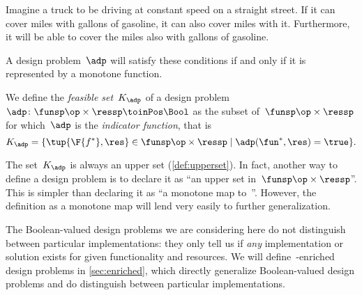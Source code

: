 \begin{example}
    Imagine a truck to be driving at constant speed on a straight street.
    If it can cover \unit[100]{miles} with \unit[5]{gallons} of gasoline, it can also cover \unit[80]{miles} with it.
    Furthermore, it will be able to cover the \unit[100]{miles} also with \unit[10]{gallons} of gasoline.
\end{example}

A design problem~$\adp$ will satisfy these conditions if and only if it is represented by a monotone function.
\begin{definition} \label{def:dp-feasible-set}
    We define the \emph{feasible set}~$K_\adp$ of a design problem~$\adp\colon \funsp\op \times \ressp\toinPos \Bool$ as the subset of~$\funsp \op\times \ressp$ for which~$\adp$ is the \emph{indicator function}, that is
    \begin{equation*}
        K_\adp = \{ \tup{\F{f^*},\res} \in \funsp \op\times \ressp  \mid
        \adp(\fun^*, \res) = \true
        \}.
    \end{equation*}
\end{definition}
\begin{remark}
    The set~$K_\adp$ is always an upper set (\cref{def:upperset}).
    In fact, another way to define a design problem is to declare it as ``an upper set in~$\funsp\op \times \ressp$''. This is simpler than declaring it as ``a monotone map to~\Bool''.
    However, the definition as a monotone map will lend very easily to further generalization.
\end{remark}
The Boolean-valued design problems we are considering here do not distinguish between particular implementations: they only tell us if \emph{any} implementation or solution exists for given functionality and resources. We will define~\Set-enriched design problems in \cref{sec:enriched}, which directly generalize Boolean-valued design problems and do distinguish between particular implementations.

